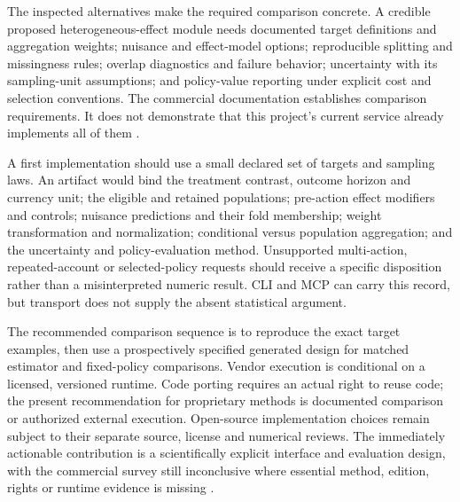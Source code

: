 The inspected alternatives make the required comparison concrete. A
credible proposed heterogeneous-effect module needs documented target
definitions and aggregation weights; nuisance and effect-model options;
reproducible splitting and missingness rules; overlap diagnostics and
failure behavior; uncertainty with its sampling-unit assumptions; and
policy-value reporting under explicit cost and selection conventions.
The commercial documentation establishes comparison requirements. It does
not demonstrate that this project's current service already implements
all of them \citep{exec13_ch_stata,exec13_ch_jmp_causal,exec13_ch_scope}.

A first implementation should use a small declared set of targets and
sampling laws. An artifact would bind the treatment contrast, outcome
horizon and currency unit; the eligible and retained populations;
pre-action effect modifiers and controls; nuisance predictions and their
fold membership; weight transformation and normalization; conditional
versus population aggregation; and the uncertainty and policy-evaluation
method. Unsupported multi-action, repeated-account or selected-policy
requests should receive a specific disposition rather than a
misinterpreted numeric result. CLI and MCP can carry this record, but
transport does not supply the absent statistical argument.

The recommended comparison sequence is to reproduce the exact target
examples, then use a prospectively specified generated design for matched
estimator and fixed-policy comparisons. Vendor execution is conditional
on a licensed, versioned runtime. Code porting requires an actual right
to reuse code; the present recommendation for proprietary methods is
documented comparison or authorized external execution. Open-source
implementation choices remain subject to their separate source, license
and numerical reviews. The immediately actionable contribution is a
scientifically explicit interface and evaluation design, with the
commercial survey still inconclusive where essential method, edition,
rights or runtime evidence is missing \citep{exec13_ch_scope}.
\label{exec13:commercial-heterogeneity-end}
